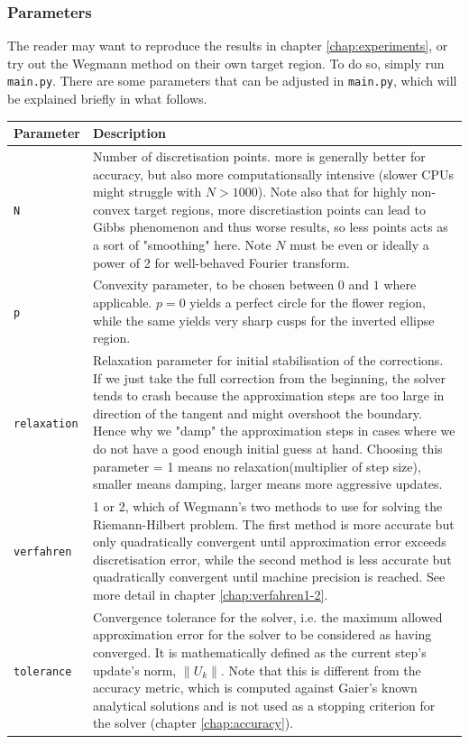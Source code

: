 \subsubsection{Parameters}\label{chap:solver_parameters}
The reader may want to reproduce the results in chapter \ref{chap:experiments}, or try out the Wegmann method on their own target region. To do so, simply run \texttt{main.py}. 
There are some parameters that can be adjusted in \texttt{main.py}, which will be explained briefly in what follows. 
\bigskip
\flushleft
\begingroup %
\def\arraystretch{1.5}
\begin{tabular}{ p{} | p{} }
    \textbf{Parameter} & \textbf{Description} \\
    \hline
    \texttt{N} & Number of discretisation points. more is generally better for accuracy, but also more computationsally intensive (slower CPUs might struggle with $N>1000$). Note also that for highly non-convex target regions, more discretiastion points can lead to Gibbs phenomenon and thus worse results, so less points acts as a sort of "smoothing" here. Note $N$ must be even or ideally a power of 2 for well-behaved Fourier transform.\\
    \texttt{p} & Convexity parameter, to be chosen between $0$ and $1$ where applicable. $p = 0$ yields a perfect circle for the flower region, while the same yields very sharp cusps for the inverted ellipse region. \\
    \texttt{relaxation} & Relaxation parameter for initial stabilisation of the corrections. If we just take the full correction from the beginning, the solver tends to crash because the approximation steps are too large in direction of the tangent and might overshoot the boundary. Hence why we "damp" the approximation steps in cases where we do not have a good enough initial guess at hand. Choosing this parameter = 1 means no relaxation(multiplier of step size), smaller means damping, larger means more aggressive updates. \\
    \texttt{verfahren} & 1 or 2, which of Wegmann's two methods to use for solving the Riemann-Hilbert problem. The first method is more accurate but only quadratically convergent until approximation error exceeds discretisation error, while the second method is less accurate but quadratically convergent until machine precision is reached. See more detail in chapter \ref{chap:verfahren1-2}. \\
    \texttt{tolerance} & Convergence tolerance for the solver, i.e. the maximum allowed approximation error for the solver to be considered as having converged. It is mathematically defined as the current step's update's norm, $\lVert U_k \rVert$. Note that this is different from the accuracy metric, which is computed against Gaier's known analytical solutions and is not used as a stopping criterion for the solver (chapter \ref{chap:accuracy}). \\

\end{tabular}
